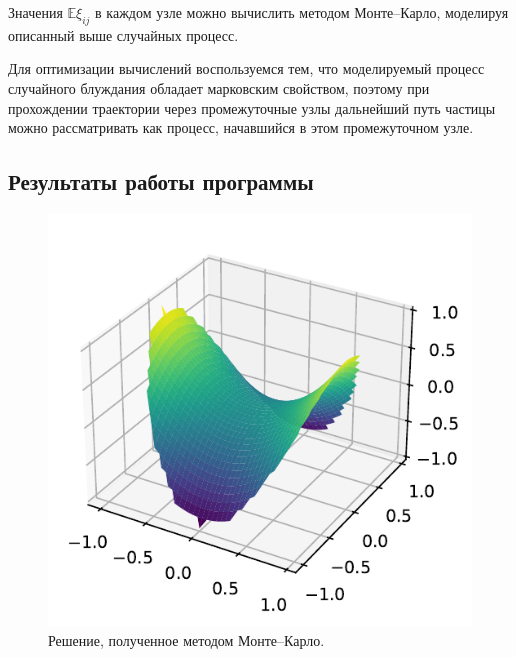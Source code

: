 \documentclass[16pt]{article}
\begin{document}
Значения $\mathbb{E}\xi_{ij}$ в каждом узле можно вычислить методом Монте--Карло, моделируя описанный выше случайных процесс.

Для оптимизации вычислений воспользуемся тем, что моделируемый процесс случайного блуждания обладает марковским свойством, поэтому при прохождении траектории через промежуточные узлы дальнейший путь частицы можно рассматривать как процесс, начавшийся в этом промежуточном узле.
\subsection{Результаты работы программы}

\begin{figure}[h]
	\center
	\includegraphics[scale=0.9]{8_1.pdf}
	\caption{Решение, полученное методом Монте--Карло.}
\end{figure}
\end{document}
